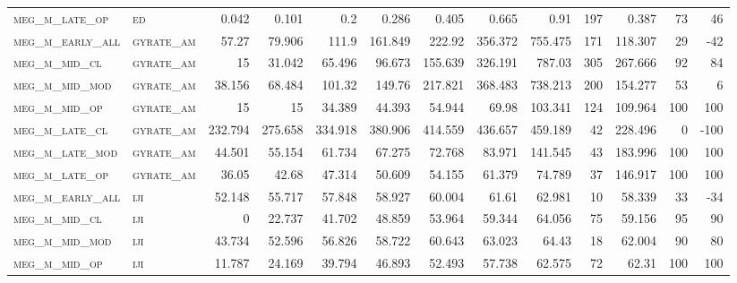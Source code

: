 \begin{landscape}
\begin{center}
\begin{footnotesize}
\begin{longtable}{llrrrrrrrr|rrr}
\textsc{meg\_m\_late\_op  } & \textsc{ed        }   & 0.042    & 0.101    & 0.2      & 0.286    & 0.405    & 0.665    & 0.91      & 197    & 0.387         & 73            & 46              \\
\textsc{meg\_m\_early\_all} & \textsc{gyrate\_am}   & 57.27    & 79.906   & 111.9    & 161.849  & 222.92   & 356.372  & 755.475   & 171    & 118.307       & 29            & -42             \\
\textsc{meg\_m\_mid\_cl   } & \textsc{gyrate\_am}   & 15       & 31.042   & 65.496   & 96.673   & 155.639  & 326.191  & 787.03    & 305    & 267.666       & 92            & 84              \\
\textsc{meg\_m\_mid\_mod  } & \textsc{gyrate\_am}   & 38.156   & 68.484   & 101.32   & 149.76   & 217.821  & 368.483  & 738.213   & 200    & 154.277       & 53            & 6               \\
\textsc{meg\_m\_mid\_op   } & \textsc{gyrate\_am}   & 15       & 15       & 34.389   & 44.393   & 54.944   & 69.98    & 103.341   & 124    & 109.964       & 100           & 100             \\
\textsc{meg\_m\_late\_cl  } & \textsc{gyrate\_am}   & 232.794  & 275.658  & 334.918  & 380.906  & 414.559  & 436.657  & 459.189   & 42     & 228.496       & 0             & -100            \\
\textsc{meg\_m\_late\_mod } & \textsc{gyrate\_am}   & 44.501   & 55.154   & 61.734   & 67.275   & 72.768   & 83.971   & 141.545   & 43     & 183.996       & 100           & 100             \\
\textsc{meg\_m\_late\_op  } & \textsc{gyrate\_am}   & 36.05    & 42.68    & 47.314   & 50.609   & 54.155   & 61.379   & 74.789    & 37     & 146.917       & 100           & 100             \\
\textsc{meg\_m\_early\_all} & \textsc{iji       }   & 52.148   & 55.717   & 57.848   & 58.927   & 60.004   & 61.61    & 62.981    & 10     & 58.339        & 33            & -34             \\
\textsc{meg\_m\_mid\_cl   } & \textsc{iji       }   & 0        & 22.737   & 41.702   & 48.859   & 53.964   & 59.344   & 64.056    & 75     & 59.156        & 95            & 90              \\
\textsc{meg\_m\_mid\_mod  } & \textsc{iji       }   & 43.734   & 52.596   & 56.826   & 58.722   & 60.643   & 63.023   & 64.43     & 18     & 62.004        & 90            & 80              \\
\textsc{meg\_m\_mid\_op   } & \textsc{iji       }   & 11.787   & 24.169   & 39.794   & 46.893   & 52.493   & 57.738   & 62.575    & 72     & 62.31         & 100           & 100             \\

\end{longtable}
\end{footnotesize}
\end{center}
\end{landscape}
